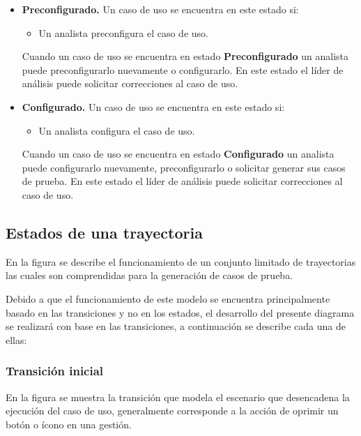 \begin{itemize}
 \item {\bf Preconfigurado.} Un caso de uso se encuentra en este estado si:
  \begin{itemize}
   \item Un analista preconfigura el caso de uso.
  \end{itemize}
  
  Cuando un caso de uso se encuentra en estado {\bf Preconfigurado} un analista puede preconfigurarlo nuevamente o configurarlo. En este estado el líder de análisis puede solicitar correcciones al caso de uso.

 \item {\bf Configurado.} Un caso de uso se encuentra en este estado si:
  \begin{itemize}
   \item Un analista configura el caso de uso.
  \end{itemize}
  
  Cuando un caso de uso se encuentra en estado {\bf Configurado} un analista puede configurarlo nuevamente, preconfigurarlo o solicitar generar sus casos de prueba. En este estado el líder de análisis puede solicitar correcciones al caso de uso.


\end{itemize}


\subsection{Estados de una trayectoria}
En la figura  se describe el funcionamiento de un conjunto limitado de trayectorias las cuales son comprendidas para la generación de casos de prueba.


Debido a que el funcionamiento de este modelo se encuentra principalmente basado en las transiciones y no en los estados, el desarrollo del presente diagrama se realizará con base en las transiciones, a continuación se describe cada una de ellas:\\

\subsubsection{Transición inicial}  
En la figura  se muestra la transición que modela el escenario que desencadena la ejecución del caso de uso, generalmente corresponde a la acción de oprimir un botón o ícono en una gestión. \\

